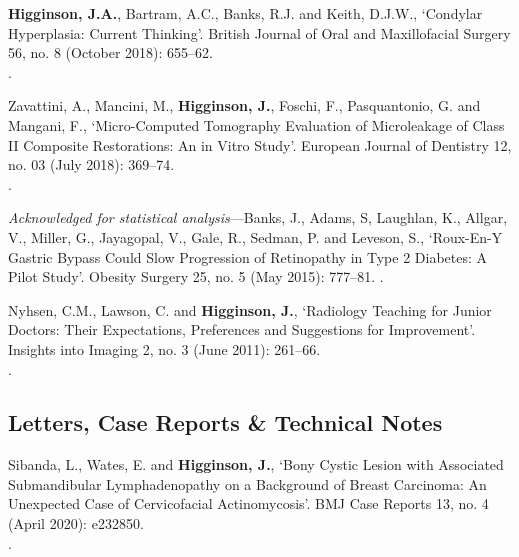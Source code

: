 \vspace{0.1cm}

 \textbf{Higginson, J.A.}, Bartram, A.C., Banks, R.J. and Keith, D.J.W., `Condylar Hyperplasia: Current Thinking’. British Journal of Oral and Maxillofacial Surgery 56, no. 8 (October 2018): 655–62. 
\\.

\vspace{0.1cm}

 Zavattini, A., Mancini, M., \textbf{Higginson, J.}, Foschi, F., Pasquantonio, G. and Mangani, F., `Micro-Computed Tomography Evaluation of Microleakage of Class II Composite Restorations: An in Vitro Study’. European Journal of Dentistry 12, no. 03 (July 2018): 369–74. 
\\.

\vspace{0.1cm}

 \textit{Acknowledged for statistical analysis}---Banks, J., Adams, S, Laughlan, K., Allgar, V., Miller, G., Jayagopal, V., Gale, R., Sedman, P. and Leveson, S., `Roux-En-Y Gastric Bypass Could Slow Progression of Retinopathy in Type 2 Diabetes: A Pilot Study’. Obesity Surgery 25, no. 5 (May 2015): 777–81. .

\vspace{0.1cm}

 Nyhsen, C.M., Lawson, C. and \textbf{Higginson, J.}, `Radiology Teaching for Junior Doctors: Their Expectations, Preferences and Suggestions for Improvement’. Insights into Imaging 2, no. 3 (June 2011): 261–66. 
\\.



\subsection*{Letters, Case Reports \& Technical Notes}

 Sibanda, L., Wates, E. and \textbf{Higginson, J.}, `Bony Cystic Lesion with Associated Submandibular Lymphadenopathy on a Background of Breast Carcinoma: An Unexpected Case of Cervicofacial Actinomycosis’. BMJ Case Reports 13, no. 4 (April 2020): e232850. 
\\.

\vspace{0.1cm}

